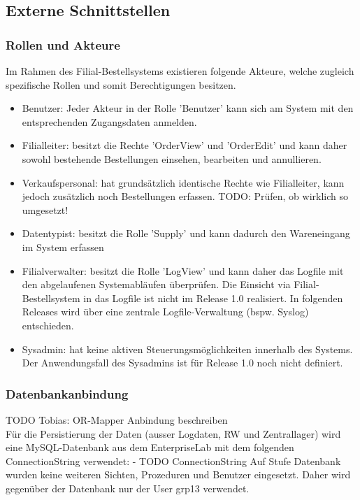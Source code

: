 \subsection{Externe Schnittstellen}
\subsubsection{Rollen und Akteure}
Im Rahmen des Filial-Bestellsystems existieren folgende Akteure, welche zugleich spezifische Rollen und somit Berechtigungen besitzen.
\begin{itemize}
	\item Benutzer: Jeder Akteur in der Rolle 'Benutzer' kann sich am System mit den entsprechenden Zugangsdaten anmelden.
	\item Filialleiter: besitzt die Rechte 'OrderView' und 'OrderEdit' und kann daher sowohl bestehende Bestellungen einsehen, bearbeiten und annullieren.
	\item Verkaufspersonal: hat grundsätzlich identische Rechte wie Filialleiter, kann jedoch zusätzlich noch Bestellungen erfassen. TODO: Prüfen, ob wirklich so umgesetzt!
	\item Datentypist: besitzt die Rolle 'Supply' und kann dadurch den Wareneingang im System erfassen
	\item Filialverwalter: besitzt die Rolle 'LogView' und kann daher das Logfile mit den abgelaufenen Systemabläufen überprüfen. Die Einsicht via Filial-Bestellsystem in das Logfile ist nicht im Release 1.0 realisiert. In folgenden Releases wird über eine zentrale Logfile-Verwaltung (bspw. Syslog) entschieden. 
	\item Sysadmin: hat keine aktiven Steuerungsmöglichkeiten innerhalb des Systems. Der Anwendungsfall des Sysadmins ist für Release 1.0 noch nicht definiert.
\end{itemize}
\subsubsection{Datenbankanbindung}
TODO Tobias: OR-Mapper Anbindung beschreiben\\

Für die Persistierung der Daten (ausser Logdaten, RW und Zentrallager) wird eine MySQL-Datenbank aus dem EnterpriseLab mit dem folgenden ConnectionString verwendet:
- TODO ConnectionString
Auf Stufe Datenbank wurden keine weiteren Sichten, Prozeduren und Benutzer eingesetzt. Daher wird gegenüber der Datenbank nur der User grp13 verwendet.
